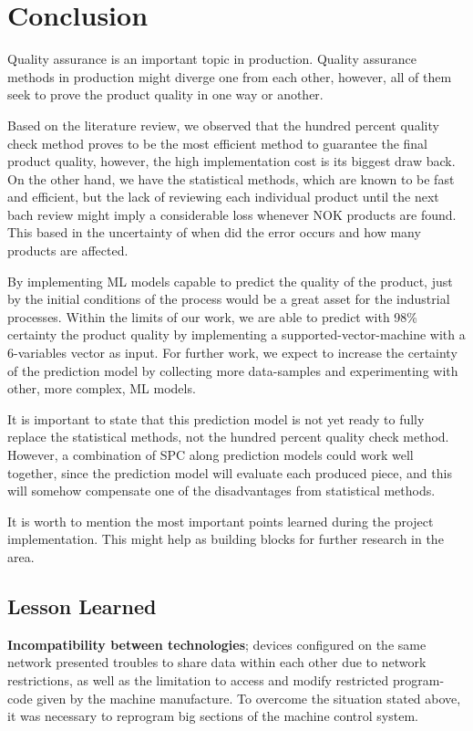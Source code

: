 \documentclass[5p,times,procedia]{elsarticle}
\begin{document}
\section{Conclusion}

Quality assurance is an important topic in production. Quality assurance methods in production might diverge one from each other, however, all of them seek to prove the product quality in one way or another. 

Based on the literature review, we observed that the hundred percent quality check method proves to be the most efficient method to guarantee the final product quality, however, the high implementation cost is its biggest draw back. On the other hand, we have the statistical methods, which are known to be fast and efficient, but the lack of reviewing each individual product until the next bach review might imply a considerable loss whenever NOK products are found. This based in the uncertainty of when did the error occurs and how many products are affected.

By implementing ML models capable to predict the quality of the product, just by the initial conditions of the process would be a great asset for the industrial processes. Within the limits of our work, we are able to predict with 98\% certainty the product quality by implementing a supported-vector-machine with a 6-variables vector as input. 
For further work, we expect to increase the certainty of the prediction model by collecting more data-samples and experimenting with other, more complex, ML models.

It is important to state that this prediction model is not yet ready to fully replace the statistical methods, not the hundred percent quality check method. However, a combination of SPC along prediction models could work well together, since the prediction model will evaluate each produced piece, and this will somehow compensate one of the disadvantages from statistical methods.

It is worth to mention the most important points learned during the project implementation. This might help as building blocks for further research in the area.

\subsection{Lesson Learned} %

\textbf{Incompatibility between technologies}; devices configured on the same network presented troubles to share data within each other due to network restrictions, as well as the limitation to access and modify restricted program-code given by the machine manufacture. 
To overcome the situation stated above, it was necessary to reprogram big sections of the machine control system.
\end{document}

